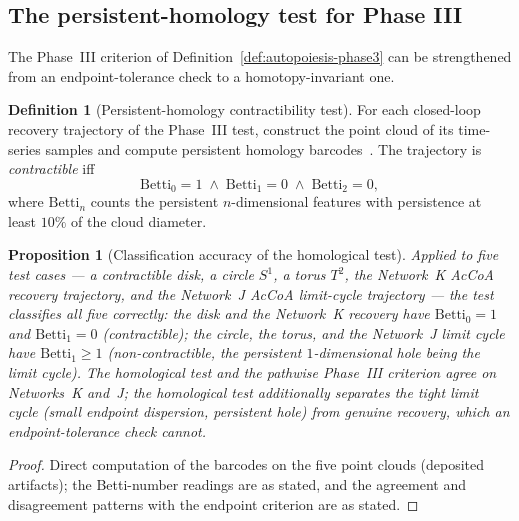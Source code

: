 \documentclass[11pt,a4paper]{article}
\theoremstyle{plain}
\newtheorem{proposition}[theorem]{Proposition}
\theoremstyle{definition}
\newtheorem{definition}[theorem]{Definition}
\theoremstyle{remark}
\begin{document}
\subsection{The persistent-homology test for Phase III}
\label{sec:network-persistent}

The Phase~III criterion of Definition~\ref{def:autopoiesis-phase3}
can be strengthened from an endpoint-tolerance check to a
homotopy-invariant one.

\begin{definition}[Persistent-homology contractibility test]
\label{def:persistent-homology-contractibility}
For each closed-loop recovery trajectory of the Phase~III test,
construct the point cloud of its time-series samples and compute
persistent homology barcodes~\citep{tralie2018ripser}. The
trajectory is \emph{contractible} iff
\begin{equation}
  \mathrm{Betti}_0 = 1 \;\wedge\; \mathrm{Betti}_1 = 0 \;\wedge\;
  \mathrm{Betti}_2 = 0,
\end{equation}
where $\mathrm{Betti}_n$ counts the persistent
$n$-dimensional features with persistence at least $10\%$ of the
cloud diameter.
\end{definition}

\begin{proposition}[Classification accuracy of the homological test]
\label{prop:persistent-homology-verdict}
Applied to five test cases --- a contractible disk, a circle
$S^{1}$, a torus $T^{2}$, the Network~K AcCoA recovery
trajectory, and the Network~J AcCoA limit-cycle trajectory --- the
test classifies all five correctly: the disk and the Network~K
recovery have $\mathrm{Betti}_0=1$ and $\mathrm{Betti}_1=0$
(contractible); the circle, the torus, and the Network~J limit
cycle have $\mathrm{Betti}_1\geq1$ (non-contractible, the
persistent $1$-dimensional hole being the limit cycle). The
homological test and the pathwise Phase~III criterion agree on
Networks~K and~J; the homological test additionally separates the
tight limit cycle (small endpoint dispersion, persistent hole)
from genuine recovery, which an endpoint-tolerance check cannot.
\end{proposition}

\begin{proof}
Direct computation of the barcodes on the five point clouds
(deposited artifacts); the Betti-number readings are as stated,
and the agreement and disagreement patterns with the endpoint
criterion are as stated.
\end{proof}
\end{document}
